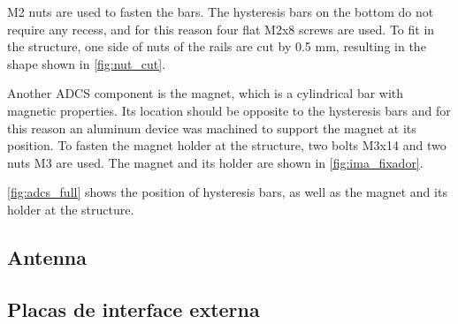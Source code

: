 M2 nuts are used to fasten the bars. The hysteresis bars on the bottom do not require any recess, and for this reason four flat M2x8 screws are used. To fit in the structure, one side of nuts of the rails are cut by 0.5 mm, resulting in the shape shown in \autoref{fig:nut_cut}.


Another ADCS component is the magnet, which is a cylindrical bar with magnetic properties. Its location should be opposite to the hysteresis bars and for this reason an aluminum device was machined to support the magnet at its position. To fasten the magnet holder at the structure, two bolts M3x14 and two nuts M3 are used. The magnet and its holder are shown in \autoref{fig:ima_fixador}.

\autoref{fig:adcs_full} shows the position of hysteresis bars, as well as the magnet and its holder at the structure.




\subsection{Antenna}


\subsection{Placas de interface externa}

